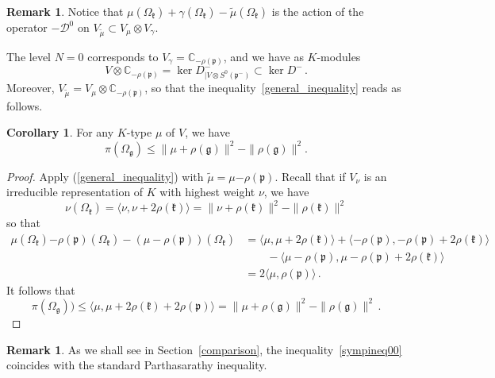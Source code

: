 \documentclass{amsart}[draft,11pt]
\newcommand{\mk}{\mathfrak{k}}
\newcommand{\fg}{{\mathfrak{g}}}
\newcommand{\fk}{{\mathfrak{k}}}
\newcommand{\fp}{{\mathfrak{p}}}
\numberwithin{equation}{section}
\theoremstyle{definition}
\newtheorem{corollary}[theorem]{Corollary}
\newtheorem{remark}[theorem]{Remark}
\begin{document}
\begin{remark}
Notice that $\mu(\Omega_\mk)+\gamma(\Omega_\mk)-\tilde{\mu}(\Omega_\mk)$ is the action of the operator $-\mathcal{D}^0$
on $V_{\tilde{\mu}}\subset V_\mu\otimes V_\gamma$. 
\end{remark}

The level $N=0$ corresponds to $V_\gamma=\mathbb{C}_{-\rho(\fp)}$, and we have as $K$-modules
$$V\otimes \mathbb{C}_{-\rho(\fp)}=\ker D^-_{|V\otimes S^0(\fp^-)}\subset \ker D^-\,.$$ 
Moreover,
$V_{\tilde{\mu}}=V_\mu\otimes \mathbb{C}_{-\rho(\fp)}$, so that  the inequality~\eqref{general_inequality}
reads as follows. 

\begin{corollary}
For any $K$-type $\mu$ of $V$, we have
\begin{equation}
    \label{sympineq00}
    \pi(\Omega_\fg)  \leq  \|\mu+\rho(\fg)\|^2-\|\rho(\fg)\|^2.
\end{equation}
\end{corollary}
\begin{proof}
Apply (\ref{general_inequality}) with $\tilde\mu=\mu {-\rho(\fp)}$. 
Recall that if $V_\nu$ is an irreducible representation of $K$ with highest weight $\nu$, we have
$$
\nu(\Omega_\fk)=\langle \nu,\nu+2\rho(\fk) \rangle{ }=\|\nu+\rho(\fk)\|^2-\|\rho(\fk)\|^2
$$
so that
\begin{align*}
    \mu(\Omega_\fk){-\rho(\fp)}(\Omega_\fk)-
    (\mu-\rho(\fp))(\Omega_\fk) &=\langle \mu,\mu+2\rho(\fk)\rangle + 
    \langle{-\rho(\fp)},{-\rho(\fp)} +2\rho(\fk)\rangle \\
    &\qquad - \langle \mu-\rho(\fp),\mu-\rho(\fp)+2\rho(\fk)\rangle \\
    &=2\langle\mu,\rho(\fp)\rangle \,.
\end{align*}
It follows that
$$
    \pi(\Omega_\fg)) \leq 
    \langle \mu,\mu+2\rho(\fk)+2\rho(\fp)\rangle  =
    \|\mu+\rho(\fg)\|^2-\|\rho(\fg)\|^2\,.
$$
\end{proof}
\begin{remark}
As we shall see in Section~\ref{comparison}, the inequality~\eqref{sympineq00} coincides with the standard Parthasarathy inequality.
\end{remark}

\end{document}
